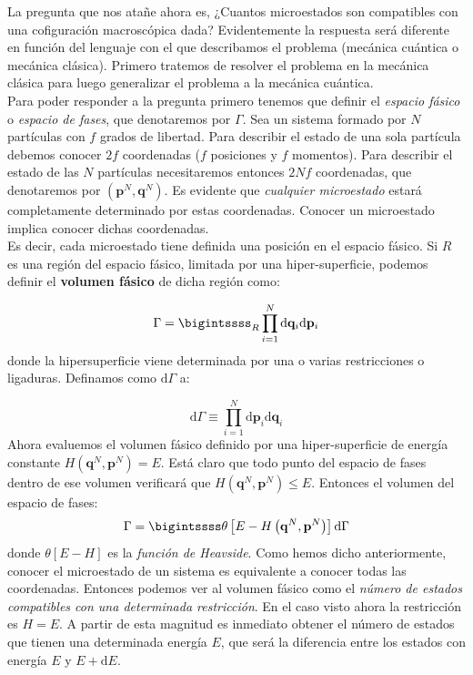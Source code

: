 \documentclass[12pt,a4paper]{article}
\numberwithin{equation}{section}
\numberwithin{figure}{section}
\newcommand{\parentesis}[1]{\left( #1  \right)}
\newcommand{\ccorchetes}[1]{\left[ #1  \right]}
\newcommand{\D}{\mathrm{d}}
\newcommand{\pn}{\mathbf{p}}
\newcommand{\qn}{\mathbf{q}}
\theoremstyle{definition}
\begin{document}
La pregunta que nos atañe ahora es, ¿Cuantos microestados son compatibles con una cofiguración macroscópica dada? Evidentemente la respuesta será diferente en función del lenguaje con el que describamos el problema (mecánica cuántica o mecánica clásica). Primero tratemos de resolver el problema en la mecánica clásica para luego generalizar el problema a la mecánica cuántica. \\

Para poder responder a la pregunta primero tenemos que definir el \textit{espacio fásico} o \textit{espacio de fases}, que denotaremos por $\Gamma$. Sea un sistema formado por $N$ partículas con $f$ grados de libertad. Para describir el estado de una sola partícula debemos conocer $2f$ coordenadas ($f$ posiciones y $f$ momentos). Para describir el estado de las $N$ partículas necesitaremos entonces $2Nf$ coordenadas, que denotaremos por $(\pn^N,\qn^N)$. Es evidente que \textit{cualquier microestado} estará completamente determinado por estas coordenadas. Conocer un microestado implica conocer dichas coordenadas. \\

Es decir, cada microestado tiene definida una posición en el espacio fásico. Si $R$ es una región del espacio fásico, limitada por una hiper-superficie, podemos definir el \textbf{volumen fásico} de dicha región como:

\begin{equation}
\Gamma  = \bigintssss_R \prod^N_{i=1} \D \qn_i \D \pn_i
\end{equation}
donde la hipersuperficie viene determinada por una o varias restricciones o ligaduras. Definamos como $\D \Gamma$ a:

\begin{equation}
\D \Gamma  \equiv \prod_{i=1}^N \D \pn_i \D \qn_i
\end{equation}
Ahora evaluemos el volumen fásico definido por una hiper-superficie de energía constante $H(\qn^N,\pn^N)=E$. Está claro que todo punto del espacio de fases dentro de ese volumen verificará que $H (\qn^N,\pn^N ) \leq  E$. Entonces el volumen del espacio de fases:
\begin{equation}
\Gamma = \bigintssss \theta\ccorchetes{E-H\parentesis{\qn^N,\pn^N}} \D \Gamma
\end{equation}
donde $\theta[E-H]$ es la \textit{función de Heavside}. Como hemos dicho anteriormente, conocer el microestado de un sistema es equivalente a conocer todas las coordenadas. Entonces podemos ver al volumen fásico como el \textit{número de estados compatibles con una determinada restricción}. En el caso visto ahora la restricción es $H=E$. A partir de esta magnitud es inmediato obtener el número de estados que tienen una determinada energía $E$, que será la diferencia entre los estados con energía $E$ y $E+\D E$. \\
\end{document}
